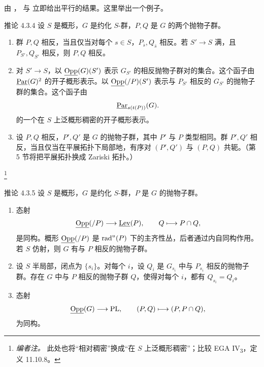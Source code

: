 由 \textup{}， 与  立即给出平行的结果。这里举出一个例子。
\begin{sgastatement}{推论 4.3.4}
设 \(S\) 是概形，\(G\) 是约化 \(S\)-群，\(P,Q\) 是 \(G\) 的两个抛物子群。
\begin{enumerate}[label=\textup{(\roman*)}]
\item 群 \(P,Q\) 相反，当且仅当对每个 \(s\in S\)，\(P_{\bar s},Q_{\bar s}\) 相反。若 \(S'\to S\) 满，且 \(P_{S'},Q_{S'}\) 相反，则 \(P,Q\) 相反。
\item 对 \(S'\to S\)，以 \(\underline{\operatorname{Opp}}(G)(S')\) 表示 \(G_{S'}\) 的相反抛物子群对的集合。这个函子由 \(\underline{\operatorname{Par}}(G)^2\) 的开子概形表示。以 \(\underline{\operatorname{Opp}}(/P)(S')\) 表示与 \(P_{S'}\) 相反的 \(G_{S'}\) 的抛物子群的集合。这个函子由
\[
 \underline{\operatorname{Par}}_{s(t(P))}(G).
\]
的一个在 \(S\) 上泛概形稠密的开子概形表示。
\item 设 \(P,Q\) 相反，\(P',Q'\) 是 \(G\) 的抛物子群，其中 \(P'\) 与 \(P\) 类型相同。群 \(P',Q'\) 相反，当且仅当在平展拓扑下局部地，有序对 \((P',Q')\) 与 \((P,Q)\) 共轭。（第 5 节将把平展拓扑换成 Zariski 拓扑。）
\end{enumerate}
\end{sgastatement}
\footnote{\emph{编者注。} 此处也将“相对稠密”换成“在 \(S\) 上泛概形稠密”；比较 EGA IV\textsubscript{3}，定义 11.10.8。}

\begin{sgastatement}{推论 4.3.5}
设 \(S\) 是概形，\(G\) 是约化 \(S\)-群，\(P\) 是 \(G\) 的抛物子群。
\begin{enumerate}[label=\textup{(\roman*)}]
\item 态射
\[
 \underline{\operatorname{Opp}}(/P)\longrightarrow\underline{\operatorname{Lev}}(P),\qquad Q\longmapsto P\cap Q,
\]
是同构。概形 \(\underline{\operatorname{Opp}}(/P)\) 是 \(\operatorname{rad}^u(P)\) 下的主齐性丛，后者通过内自同构作用。若 \(S\) 仿射，则 \(G\) 有与 \(P\) 相反的抛物子群。
\item 设 \(S\) 半局部，闭点为 \(\{s_i\}\)。对每个 \(i\)，设 \(Q_i\) 是 \(G_{s_i}\) 中与 \(P_{s_i}\) 相反的抛物子群。存在 \(G\) 中与 \(P\) 相反的抛物子群 \(Q\)，使得对每个 \(i\)，都有 \(Q_{s_i}=Q_i\)。
\item 态射
\[
 \underline{\operatorname{Opp}}(G)\longrightarrow\mathrm{PL},\qquad
 (P,Q)\longmapsto(P,P\cap Q),
\]
为同构。
\end{enumerate}
\end{sgastatement}

